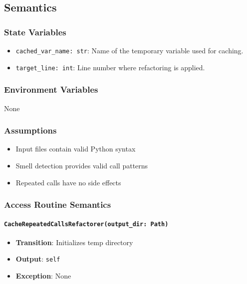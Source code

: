 \documentclass[12pt, titlepage]{article}
\begin{document}
\subsection{Semantics}

\subsubsection{State Variables}
\begin{itemize}
  \item \texttt{cached\_var\_name: str}: Name of the temporary variable used for caching.
  \item \texttt{target\_line: int}: Line number where refactoring is applied.
\end{itemize}

\subsubsection{Environment Variables}
None

\subsubsection{Assumptions}
\begin{itemize}
\item Input files contain valid Python syntax
\item Smell detection provides valid call patterns
\item Repeated calls have no side effects
\end{itemize}

\subsubsection{Access Routine Semantics}

\paragraph{\texttt{CacheRepeatedCallsRefactorer(output\_dir: Path)}}
\begin{itemize}
\item \textbf{Transition}: Initializes temp directory
\item \textbf{Output}: \texttt{self}
\item \textbf{Exception}: None
\end{itemize}
\end{document}
